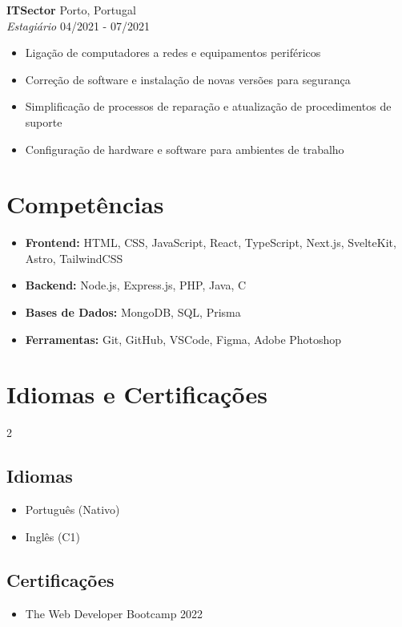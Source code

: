 \documentclass[letterpaper,10pt]{article}
\begin{document}
\textbf{ITSector} \hfill Porto, Portugal \\
\textit{Estagiário} \hfill 04/2021 - 07/2021
\begin{itemize}[leftmargin=0.2in]
  \item Ligação de computadores a redes e equipamentos periféricos
  \item Correção de software e instalação de novas versões para segurança
  \item Simplificação de processos de reparação e atualização de procedimentos de suporte
  \item Configuração de hardware e software para ambientes de trabalho
\end{itemize}

\section*{Competências}
\begin{itemize}[leftmargin=0.2in]
  \item \textbf{Frontend:} HTML, CSS, JavaScript, React, TypeScript, Next.js, SvelteKit, Astro, TailwindCSS
  \item \textbf{Backend:} Node.js, Express.js, PHP, Java, C
  \item \textbf{Bases de Dados:} MongoDB, SQL, Prisma
  \item \textbf{Ferramentas:} Git, GitHub, VSCode, Figma, Adobe Photoshop
\end{itemize}

\section*{Idiomas e Certificações}
\begin{multicols}{2}
\subsection*{Idiomas}
\begin{itemize}[leftmargin=0.2in]
  \item Português (Nativo)
  \item Inglês (C1)
\end{itemize}

\columnbreak

\subsection*{Certificações}
\begin{itemize}[leftmargin=0.2in]
  \item The Web Developer Bootcamp 2022
\end{itemize}
\end{multicols}
\end{document}
